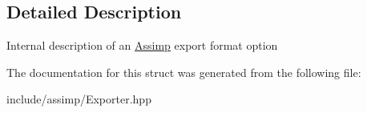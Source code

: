 \subsection{\-Detailed \-Description}
\-Internal description of an \hyperlink{namespaceAssimp}{\-Assimp} export format option 

\-The documentation for this struct was generated from the following file\-:\begin{DoxyCompactItemize}
\item 
include/assimp/\-Exporter.\-hpp\end{DoxyCompactItemize}
